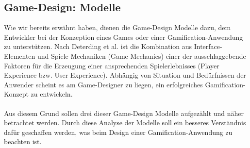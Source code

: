 \documentclass[a4paper,12pt,twoside]{scrartcl}
\begin{document}
\subsection{Game-Design: Modelle}
\label{Game-Design Modelle}
Wie wir bereits erwähnt haben, dienen die Game-Design Modelle dazu, dem Entwickler bei der Konzeption eines Games oder einer Gamification-Anwendung zu unterstützen. Nach Deterding et al. \cite{Deterding2011} ist die Kombination aus Interface-Elementen und Spiele-Mechaniken (Game-Mechanics) einer der ausschlaggebende Faktoren für die Erzeugung einer ansprechenden Spielerlebnisses (Player Experience bzw. User Experience). Abhängig von Situation und Bedürfnissen der Anwender scheint es am Game-Designer zu liegen, ein erfolgreiches Gamification-Konzept zu entwickeln. 
\\\\
Aus diesem Grund sollen drei dieser Game-Design Modelle aufgezählt und näher betrachtet werden. Durch diese Analyse der Modelle soll ein besseres Verständnis dafür geschaffen werden, was beim Design einer Gamification-Anwendung zu beachten ist.
\end{document}
